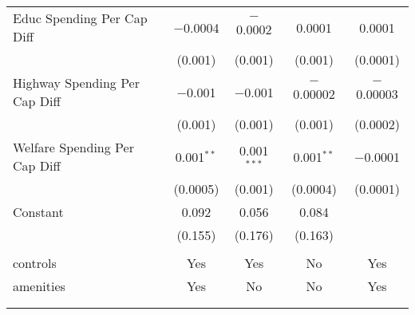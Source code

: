 \begin{table}[!htbp]
\begin{tabular}{@{\extracolsep{5pt}}lcccc}
  Educ Spending Per Cap Diff & $-$0.0004 & $-$0.0002 & 0.0001 & 0.0001 \\ 
  & (0.001) & (0.001) & (0.001) & (0.0001) \\ 
  Highway Spending Per Cap Diff & $-$0.001 & $-$0.001 & $-$0.00002 & $-$0.00003 \\ 
  & (0.001) & (0.001) & (0.001) & (0.0002) \\ 
  Welfare Spending Per Cap Diff & 0.001$^{**}$ & 0.001$^{***}$ & 0.001$^{**}$ & $-$0.0001 \\ 
  & (0.0005) & (0.001) & (0.0004) & (0.0001) \\ 
  Constant & 0.092 & 0.056 & 0.084 &  \\ 
  & (0.155) & (0.176) & (0.163) &  \\ 
 \hline \\[-1.8ex] 
controls & Yes & Yes & No & Yes \\ 
amenities & Yes & No & No & Yes \\ 
\hline \\[-1.8ex] 
\hline 
\hline \\[-1.8ex] 
\end{tabular} 
\end{table} 
